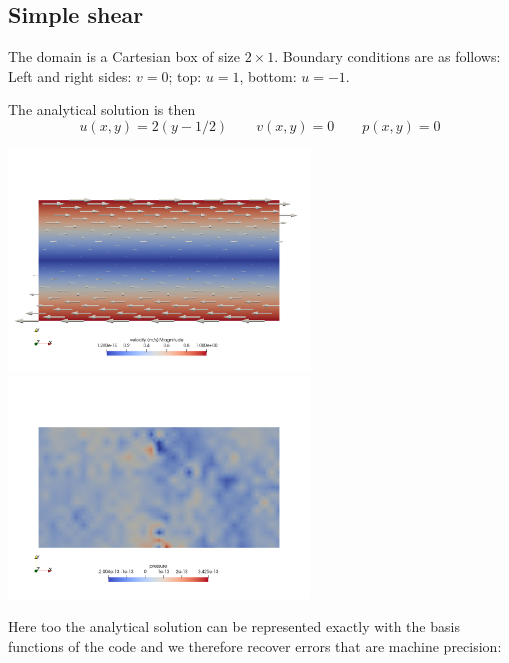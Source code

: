 \documentclass[a4paper]{article}
\begin{document}
\subsection{Simple shear}

The domain is a Cartesian box of size $2\times 1$.
Boundary conditions are as follows:
Left and right sides: $v=0$; top: $u=1$, bottom: $u=-1$.

The analytical solution is then
\[
u(x,y)=2(y-1/2)
\qquad
v(x,y)=0
\qquad
p(x,y)=0
\]

\begin{center}
\includegraphics[width=8cm]{./results/benchmark_simple_shear/vel}
\includegraphics[width=8cm]{./results/benchmark_simple_shear/press}
\end{center}

Here too the analytical solution can be represented exactly
with the basis functions of the code
and we therefore recover errors that are machine precision:
\end{document}
